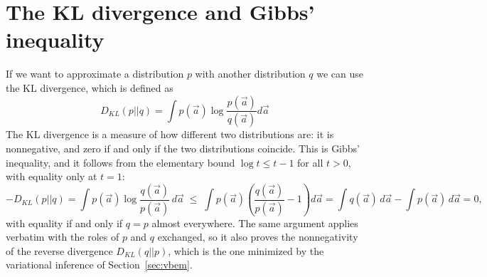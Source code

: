 \documentclass{article}
\begin{document}
\section{The KL divergence and Gibbs' inequality} \label{variational_inference}
If we want to approximate a distribution $p$ with another distribution $q$ we can use the KL divergence, which is defined as
\begin{equation}
    D_{KL}(p||q) = \int p(\vec{a}) \log \frac{p(\vec{a})}{q(\vec{a})} d\vec{a}
\end{equation}
The KL divergence is a measure of how different two distributions are: it is nonnegative, and zero if and only if the two distributions coincide. This is Gibbs' inequality, and it follows from the elementary bound $\log t \le t - 1$ for all $t>0$, with equality only at $t=1$:
\begin{equation}
    -D_{KL}(p||q) = \int p(\vec a) \log \frac{q(\vec a)}{p(\vec a)}\, d\vec a \;\le\; \int p(\vec a)\left(\frac{q(\vec a)}{p(\vec a)} - 1\right) d\vec a = \int q(\vec a)\, d\vec a - \int p(\vec a)\, d\vec a = 0,
\end{equation}
with equality if and only if $q = p$ almost everywhere. The same argument applies verbatim with the roles of $p$ and $q$ exchanged, so it also proves the nonnegativity of the reverse divergence $D_{KL}(q||p)$, which is the one minimized by the variational inference of Section~\ref{sec:vbem}.
\printbibliography
\end{document}
